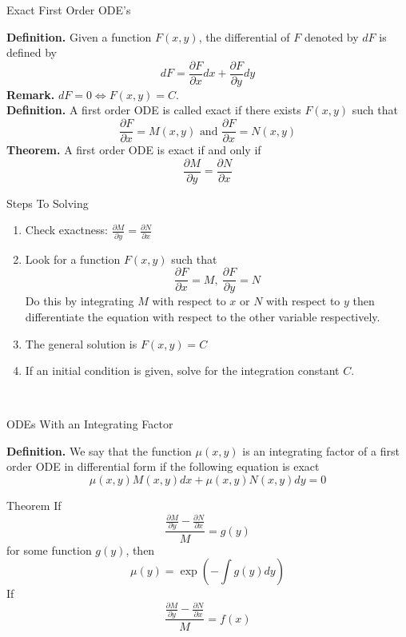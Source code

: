 \documentclass{article}
\begin{document}
\begin{multicols*}{3}
\begin{blackbox}{Exact First Order ODE's}
{    \textbf{Definition.} Given a function $F(x,y)$, the differential of $F$ denoted by $dF$ is defined by\\[-2ex]
    \[dF = \frac{\partial F}{\partial x} dx + \frac{\partial F}{\partial y}dy\]
    \textbf{Remark.} $dF = 0 \iff F(x,y) = C$.\\[1ex]
    \textbf{Definition.} A first order ODE is called exact if there exists $F(x,y)$ such that 
    \[\frac{\partial F}{\partial x} = M(x,y) \text{ and } \frac{\partial F}{\partial x} = N(x,y)\]
    \textbf{Theorem.} A first order ODE is exact if and only if
    \[\frac{\partial M}{\partial y} = \frac{\partial N}{\partial x}\]
    \begin{bluebox}{Steps To Solving}
        \begin{enumerate}[align=left]
            \item Check exactness: $\frac{\partial M}{\partial y} = \frac{\partial N}{\partial x}$
            \item Look for a function $F(x,y)$ such that\\[-0.0001mm]
            \[\frac{\partial F}{\partial x} = M, \ \frac{\partial F}{\partial y} = N\]
            Do this by integrating $M$ with respect to $x$ or $N$ with respect to $y$ then differentiate the equation with respect to the other variable respectively.
            \item The general solution is $F(x,y) = C$
            \item If an initial condition is given, solve for the integration constant $C$.
        \end{enumerate}
    \end{bluebox}\\[-2ex]
    }
\end{blackbox} 
\begin{blackbox}{ODEs With an Integrating Factor}
    {\scriptsize
    \textbf{Definition.} We say that the function $\mu(x,y)$ is an integrating factor of a first order ODE in differential form if the following equation is exact \\[-2ex]
    \[\mu(x,y)M(x,y)dx + \mu(x,y)N(x,y)dy = 0\]
    \begin{redbox}{Theorem}
        If \\[-6ex]
        \[\frac{\frac{\partial M}{\partial y} - \frac{\partial N}{\partial x}}{M} = g(y)\]
        for some function $g(y)$, then\\[-2ex]
        \[\mu(y) = \exp\left(-\int g(y) dy\right)\]
        If \\[-5ex]
        \[\frac{\frac{\partial M}{\partial y} - \frac{\partial N}{\partial x}}{M} = f(x)\]

\end{redbox}}
\end{blackbox}
\end{multicols*}
\end{document}
